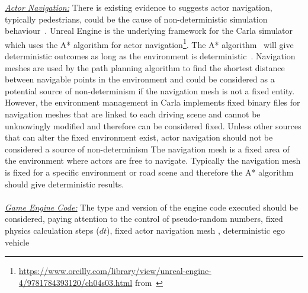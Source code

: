 \documentclass[letterpaper, 10 pt, journal, twoside]{IEEEtran}
\begin{document}
\noindent\underline{\textit{Actor Navigation:}}
There is existing evidence to suggests actor navigation, typically pedestrians, could be the cause of non-deterministic simulation behaviour~\cite{CARLABenchmark}.
% 
Unreal Engine is the underlying framework for the Carla simulator which uses the A* algorithm for actor navigation\footnote{\url{https://www.oreilly.com/library/view/unreal-engine-4/9781784393120/ch04s03.html} from~\cite{newton2016unreal}}.
%
The A* algorithm~\cite{AStarBook} will give deterministic outcomes as long as the environment is deterministic~\cite{AirsimUnrealArticle}\cite{UnrealAIDocumentation}. 
%
Navigation meshes are used by the path planning algorithm to find the shortest distance between navigable points in the environment and could be considered as a potential source of non-determinism if the navigation mesh is not a fixed entity.%
%
However, the environment management in Carla implements fixed binary files for navigation meshes that are linked to each driving scene and cannot be unknowingly modified and therefore can be considered fixed. 
%
Unless other sources that can alter the fixed environment exist, actor navigation should not be considered a source of non-determinism
%
The navigation mesh is a fixed area of the environment where actors are free to navigate. Typically the navigation mesh is fixed for a specific environment or road scene and therefore the A* algorithm
 should give deterministic results.
%
\\\\
\noindent\underline{\textit{Game Engine Code:}}
The type and version of the engine code executed should be considered, paying attention to the control of pseudo-random numbers, fixed physics calculation steps ($dt$), fixed actor navigation mesh 
, deterministic ego vehicle
\end{document}
